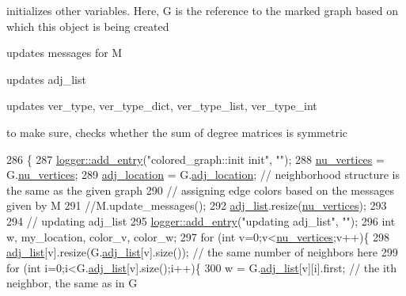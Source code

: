 initializes other variables. Here, G is the reference to the marked graph based on which this object is being created 


\begin{DoxyItemize}
\item updates messages for M
\item updates adj\+\_\+list
\item updates ver\+\_\+type, ver\+\_\+type\+\_\+dict, ver\+\_\+type\+\_\+list, ver\+\_\+type\+\_\+int
\item to make sure, checks whether the sum of degree matrices is symmetric 
\end{DoxyItemize}
\begin{DoxyCode}
286 \{
287   \hyperlink{classlogger_a710163deb17bc81f70d53d285b8ac9ac}{logger::add\_entry}(\textcolor{stringliteral}{"colored\_graph::init init"}, \textcolor{stringliteral}{""});
288   \hyperlink{classcolored__graph_a90ece8eb1fec52f3f41549ab527c1d5b}{nu\_vertices} = G.\hyperlink{classmarked__graph_acf79c6aeb8f32614cb14a5baaa6c9f9b}{nu\_vertices};
289   \hyperlink{classcolored__graph_ad657e7e86bee874d19dbc1765e1edaa7}{adj\_location} = G.\hyperlink{classmarked__graph_a3ae722ea9583ad23af34d789a88ac01a}{adj\_location}; \textcolor{comment}{// neighborhood structure is the same as the given
       graph}
290   \textcolor{comment}{// assigning edge colors based on the messages given by M}
291   \textcolor{comment}{//M.update\_messages();}
292   \hyperlink{classcolored__graph_a45dce16965079286cf3f41a54a1b2ea4}{adj\_list}.resize(\hyperlink{classcolored__graph_a90ece8eb1fec52f3f41549ab527c1d5b}{nu\_vertices});
293 
294   \textcolor{comment}{// updating adj\_list}
295   \hyperlink{classlogger_a710163deb17bc81f70d53d285b8ac9ac}{logger::add\_entry}(\textcolor{stringliteral}{"updating adj\_list"}, \textcolor{stringliteral}{""});
296   \textcolor{keywordtype}{int} w, my\_location, color\_v, color\_w;
297   \textcolor{keywordflow}{for} (\textcolor{keywordtype}{int} v=0;v<\hyperlink{classcolored__graph_a90ece8eb1fec52f3f41549ab527c1d5b}{nu\_vertices};v++)\{
298     \hyperlink{classcolored__graph_a45dce16965079286cf3f41a54a1b2ea4}{adj\_list}[v].resize(G.\hyperlink{classmarked__graph_a1a0bf7ca413a278763f7c878b3b6fd6f}{adj\_list}[v].size()); \textcolor{comment}{// the same number of neighbors here}
299     \textcolor{keywordflow}{for} (\textcolor{keywordtype}{int} i=0;i<G.\hyperlink{classmarked__graph_a1a0bf7ca413a278763f7c878b3b6fd6f}{adj\_list}[v].size();i++)\{
300       w = G.\hyperlink{classmarked__graph_a1a0bf7ca413a278763f7c878b3b6fd6f}{adj\_list}[v][i].first; \textcolor{comment}{// the ith neighbor, the same as in G}

\end{DoxyCode}
